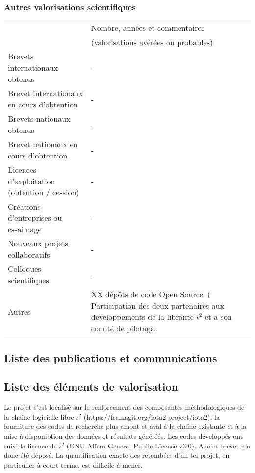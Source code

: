 \subsubsection*{Autres valorisations scientifiques} 
\begin{table}[htbp]
\small
    \centering
    \begin{tabular}{|p{5.5cm}|p{6cm}|}
    \hline
& Nombre, années et commentaires \\
&(valorisations avérées ou probables)\\\hline
Brevets internationaux obtenus&-\\\hline
Brevet internationaux en cours d’obtention&- \\\hline
Brevets nationaux obtenus&- \\\hline
Brevet nationaux en cours d’obtention&- \\\hline
Licences d’exploitation (obtention / cession)&- \\\hline
Créations d’entreprises ou essaimage&- \\\hline
Nouveaux projets collaboratifs & - \\\hline
Colloques scientifiques&- \\\hline
Autres & XX dépôts de code Open Source + Participation des deux partenaires aux développements de la librairie $\iota^2$ et à son \href{https://framagit.org/iota2-project/iota2/-/wikis/Project-Steering-Committee}{comité de pilotage}. \\
\hline
    \end{tabular}
    \label{tab:valo_other}
\end{table}


\subsection{Liste des publications et communications}

\printbibliography[keyword={LASTIG-CESBIO-j},title={Journaux}]
\printbibliography[keyword={LASTIG-CESBIO-c},title={Conférences}]
\printbibliography[keyword={LASTIG-CESBIO-a},title={Autres communications}]

\subsection{Liste des éléments de valorisation}
Le projet s'est focalisé sur le renforcement des composantes méthodologiques de la chaîne logicielle libre $\iota^2$ (\href{https://framagit.org/iota2-project/iota2}{https://framagit.org/iota2-project/iota2}), la fourniture des codes de recherche plus amont et aval à la chaîne existante et à la mise à disponibtion des données et résultats généréés. Les codes développés ont suivi la licence de $\iota^2$ (GNU Affero General Public License v3.0). Aucun brevet n'a donc été déposé. La quantification exacte des retombées d'un tel projet, en particulier à court terme, est difficile à mener.

